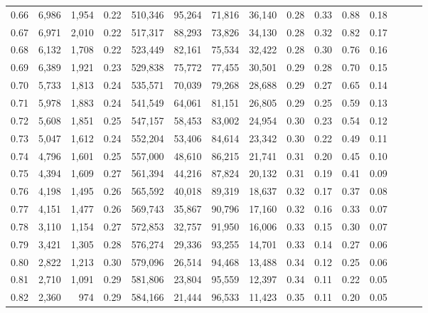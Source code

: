 \begin{tabular}{rrrrrrrrrrrrrrr}
0.66 &   6,986 &  1,954 &  0.22 &  510,346 &   95,264 &   71,816 &   36,140 &  0.28 &  0.33 &  0.88 &      0.18 \\
0.67 &   6,971 &  2,010 &  0.22 &  517,317 &   88,293 &   73,826 &   34,130 &  0.28 &  0.32 &  0.82 &      0.17 \\
0.68 &   6,132 &  1,708 &  0.22 &  523,449 &   82,161 &   75,534 &   32,422 &  0.28 &  0.30 &  0.76 &      0.16 \\
0.69 &   6,389 &  1,921 &  0.23 &  529,838 &   75,772 &   77,455 &   30,501 &  0.29 &  0.28 &  0.70 &      0.15 \\
0.70 &   5,733 &  1,813 &  0.24 &  535,571 &   70,039 &   79,268 &   28,688 &  0.29 &  0.27 &  0.65 &      0.14 \\
0.71 &   5,978 &  1,883 &  0.24 &  541,549 &   64,061 &   81,151 &   26,805 &  0.29 &  0.25 &  0.59 &      0.13 \\
0.72 &   5,608 &  1,851 &  0.25 &  547,157 &   58,453 &   83,002 &   24,954 &  0.30 &  0.23 &  0.54 &      0.12 \\
0.73 &   5,047 &  1,612 &  0.24 &  552,204 &   53,406 &   84,614 &   23,342 &  0.30 &  0.22 &  0.49 &      0.11 \\
0.74 &   4,796 &  1,601 &  0.25 &  557,000 &   48,610 &   86,215 &   21,741 &  0.31 &  0.20 &  0.45 &      0.10 \\
0.75 &   4,394 &  1,609 &  0.27 &  561,394 &   44,216 &   87,824 &   20,132 &  0.31 &  0.19 &  0.41 &      0.09 \\
0.76 &   4,198 &  1,495 &  0.26 &  565,592 &   40,018 &   89,319 &   18,637 &  0.32 &  0.17 &  0.37 &      0.08 \\
0.77 &   4,151 &  1,477 &  0.26 &  569,743 &   35,867 &   90,796 &   17,160 &  0.32 &  0.16 &  0.33 &      0.07 \\
0.78 &   3,110 &  1,154 &  0.27 &  572,853 &   32,757 &   91,950 &   16,006 &  0.33 &  0.15 &  0.30 &      0.07 \\
0.79 &   3,421 &  1,305 &  0.28 &  576,274 &   29,336 &   93,255 &   14,701 &  0.33 &  0.14 &  0.27 &      0.06 \\
0.80 &   2,822 &  1,213 &  0.30 &  579,096 &   26,514 &   94,468 &   13,488 &  0.34 &  0.12 &  0.25 &      0.06 \\
0.81 &   2,710 &  1,091 &  0.29 &  581,806 &   23,804 &   95,559 &   12,397 &  0.34 &  0.11 &  0.22 &      0.05 \\
0.82 &   2,360 &    974 &  0.29 &  584,166 &   21,444 &   96,533 &   11,423 &  0.35 &  0.11 &  0.20 &      0.05 \\

\end{tabular}
